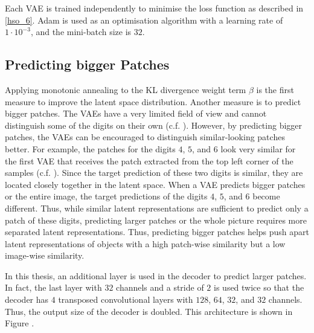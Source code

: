 Each VAE is trained independently to minimise the loss function as described in \eqref{hso_6}.
Adam  is used as an optimisation algorithm with a learning rate of $1\cdot 10^{-3}$, and the mini-batch size is $32$.


\subsection{Predicting bigger Patches}
Applying monotonic annealing to the KL divergence weight term $\beta$ is the first measure to improve the latent space distribution.
Another measure is to predict bigger patches.
The VAEs have a very limited field of view and cannot distinguish some of the digits on their own (c.f. ).
However, by predicting bigger patches, the VAEs can be encouraged to distinguish similar-looking patches better.
For example, the patches for the digits $4$, $5$, and $6$ look very similar for the first VAE that receives the patch extracted from the top left corner of the samples (c.f. ).
Since the target prediction of these two digits is similar, they are located closely together in the latent space.
When a VAE predicts bigger patches or the entire image, the target predictions of the digits $4$, $5$, and $6$ become different. Thus, while similar latent representations are sufficient to predict only a patch of these digits, predicting larger patches or the whole picture requires more separated latent representations.
Thus, predicting bigger patches helps push apart latent representations of objects with a high patch-wise similarity but a low image-wise similarity.


In this thesis, an additional layer is used in the decoder to predict larger patches. In fact, the last layer with $32$ channels and a stride of $2$ is used twice so that the decoder has $4$ transposed convolutional layers with $128$, $64$, $32$, and $32$ channels. Thus, the output size of the decoder is doubled. This architecture is shown in Figure .


